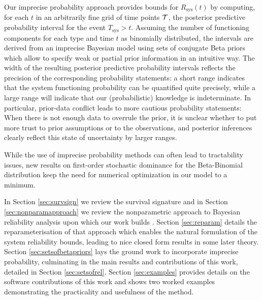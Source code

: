 \documentclass[12pt, a4paper]{elsarticle}
\newcommand{\Rsys}{R_\text{sys}}
\def\Tsys{T_\text{sys}}
\newcommand{\td}[1]{%
  \iftoggle{td}{%
    \todo[inline]{#1}%
  }{}%
}
\begin{document}
Our imprecise probability approach provides bounds for $\Rsys(t)$
by computing, for each $t$ in an arbitrarily fine grid of time points ${\cal T}$,
the posterior predictive probability interval for the event $\Tsys > t$. %
Assuming the number of functioning components for each type and time $t$ as binomially distributed, 
the intervals are derived from an imprecise Bayesian model using sets of conjugate Beta priors
which allow to specify weak or partial prior information in an intuitive way.
The width of the resulting posterior predictive probability intervals
reflects the precision of the corresponding probability statements:
a short range indicates that the system functioning probability can be quantified quite precisely,
while a large range will indicate that our (probabilistic) knowledge is indeterminate.
In particular, prior-data conflict leads to more cautious probability statements:
When there is not enough data to overrule the prior,
it is unclear whether to put more trust to prior assumptions or to the observations,
and posterior inferences clearly reflect this state of uncertainty by larger ranges.

While the use of imprecise probability methods can often lead to tractability issues,
new results on first-order stochastic dominance for the Beta-Binomial distribution
keep the need for numerical optimization in our model to a minimum.

In Section \ref{sec:survsign} we review the survival 
signature and in Section \ref{sec:nonparamapproach} we 
review the nonparametric approach to Bayesian reliability analysis
upon which our work builds 
\cite{2015:bayessurvsign}.  Section \ref{sec:reparam} details
the reparameterisation of that approach which enables the natural
formulation of the system reliability bounds, leading to
nice closed form results in some later theory.
Section \ref{sec:setsofbetapriors} lays the ground work to incorporate imprecise probability,
culminating in the main results and contributions of this 
work, detailed in Section \ref{sec:setsofrel}.  Section 
\ref{sec:examples} provides details on the software contributions
of this work and shows two worked examples
demonstrating the practicality and usefulness of the method.


\iffalse
\td{*** LOUIS: Not sure if the above is too compact or ok and whether we need to be more expansive in the orange bit above?  Thoughts appreciated! I've left text below which you may want to draw from? ***}
\end{document}
